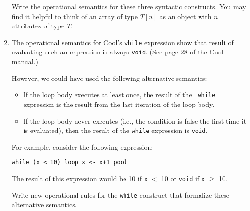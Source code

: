 \documentclass{article}
\begin{document}
\begin{enumerate}
Write the operational semantics for these three syntactic constructs. You
may find it helpful to think of an array of type $T[n]$ as an object with
$n$ attributes of type $T$.

\pagebreak

\item

The operational semantics for Cool's {\tt while} expression show that
result of evaluating such an expression is always {\tt void}.  (See page
28 of the Cool manual.)

However, we could have used the following alternative semantics:

\begin{itemize}

\item If the loop body executes at least once, the result of the {\tt
while} expression is the result from the last iteration of the loop body.

\item If the loop body never executes (i.e., the condition is false the
first time it is evaluated), then the result of the {\tt while} expression
is {\tt void}.

\end{itemize}

For example, consider the following expression:

\begin{center}
{\tt while (x < 10) loop x <- x+1 pool}
\end{center}

The result of this expression would be 10 if {\tt x} $<$ 10 or {\tt void}
if {\tt x} $\geq$ 10.

Write new operational rules for the {\tt while} construct that formalize
these alternative semantics.

\end{enumerate}
\end{document}
